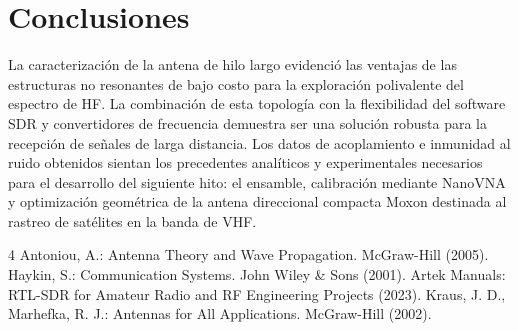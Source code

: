 \documentclass[runningheads]{llncs}
\begin{document}
\section{Conclusiones}
La caracterización de la antena de hilo largo evidenció las ventajas de las estructuras no resonantes de bajo costo para la exploración polivalente del espectro de HF. La combinación de esta topología con la flexibilidad del software SDR y convertidores de frecuencia demuestra ser una solución robusta para la recepción de señales de larga distancia. Los datos de acoplamiento e inmunidad al ruido obtenidos sientan los precedentes analíticos y experimentales necesarios para el desarrollo del siguiente hito: el ensamble, calibración mediante NanoVNA y optimización geométrica de la antena direccional compacta Moxon destinada al rastreo de satélites en la banda de VHF.

\begin{thebibliography}{4}
Antoniou, A.: Antenna Theory and Wave Propagation. McGraw-Hill (2005).
Haykin, S.: Communication Systems. John Wiley \& Sons (2001).
Artek Manuals: RTL-SDR for Amateur Radio and RF Engineering Projects (2023).
Kraus, J. D., Marhefka, R. J.: Antennas for All Applications. McGraw-Hill (2002).
\end{thebibliography}
\end{document}

